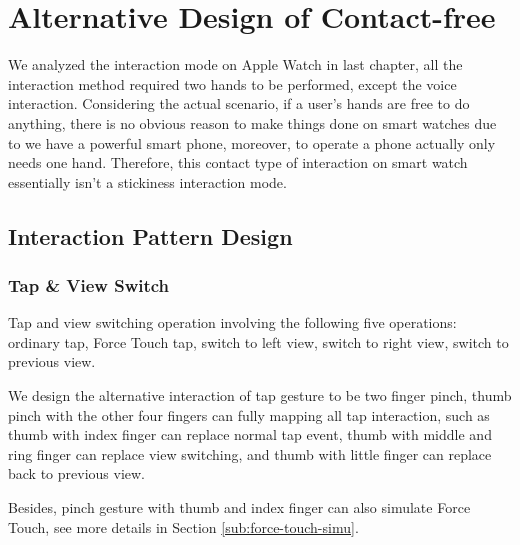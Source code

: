 \chapter{Alternative Design of Contact-free}

We analyzed the interaction mode on Apple Watch in last chapter, all the interaction method required two hands to be performed, except the voice interaction. Considering the actual scenario, if a user's hands are free to do anything, there is no obvious reason to make things done on smart watches due to we have a powerful smart phone, moreover, to operate a phone actually only needs one hand.
Therefore, this contact type of interaction on smart watch essentially isn't a stickiness interaction mode.

\section{Interaction Pattern Design}

\subsection{Tap \& View Switch}

Tap and view switching operation involving the following five operations: ordinary tap, Force Touch tap, switch to left view, switch to right view, switch to previous view.

We design the alternative interaction of tap gesture to be two finger pinch, thumb pinch with the other four fingers can fully mapping all tap interaction, such as thumb with index finger can replace normal tap event, thumb with middle and ring finger can replace view switching, and thumb with little finger can replace back to previous view.

Besides, pinch gesture with thumb and index finger can also simulate Force Touch, see more details in Section \ref{sub:force-touch-simu}.

